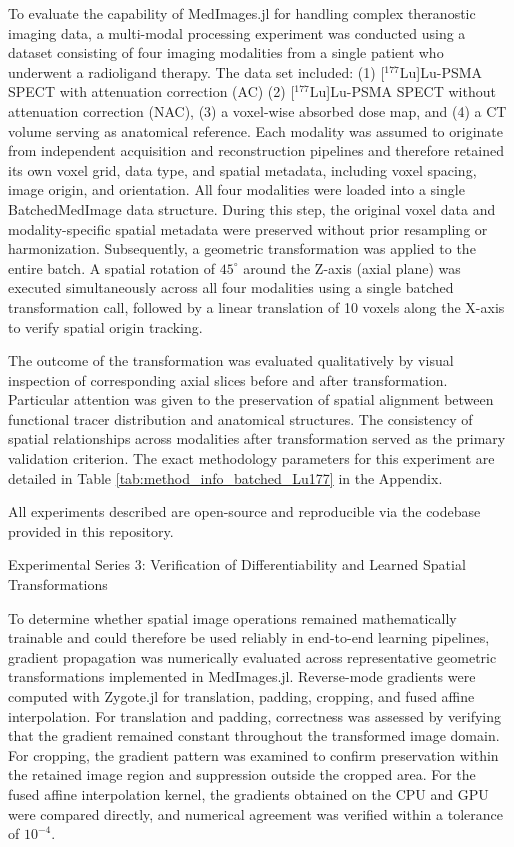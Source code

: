 \documentclass[a4paper,10pt]{elsarticle}
\begin{document}
To evaluate the capability of MedImages.jl for handling complex theranostic imaging data, a multi-modal processing experiment was conducted using a dataset consisting of four imaging modalities from a single patient who underwent a radioligand therapy. The data set included: (1) [$^{177}$Lu]Lu-PSMA SPECT with attenuation correction (AC) (2) [$^{177}$Lu]Lu-PSMA SPECT without attenuation correction (NAC), (3) a voxel-wise absorbed dose map, and (4) a CT volume serving as anatomical reference. Each modality was assumed to originate from independent acquisition and reconstruction pipelines and therefore retained its own voxel grid, data type, and spatial metadata, including voxel spacing, image origin, and orientation. All four modalities were loaded into a single BatchedMedImage data structure. During this step, the original voxel data and modality-specific spatial metadata were preserved without prior resampling or harmonization. Subsequently, a geometric transformation was applied to the entire batch. A spatial rotation of $45^{\circ}$ around the Z-axis (axial plane) was executed simultaneously across all four modalities using a single batched transformation call, followed by a linear translation of 10 voxels along the X-axis to verify spatial origin tracking.


The outcome of the transformation was evaluated qualitatively by visual inspection of corresponding axial slices before and after transformation. Particular attention was given to the preservation of spatial alignment between functional tracer distribution and anatomical structures. The consistency of spatial relationships across modalities after transformation served as the primary validation criterion. The exact methodology parameters for this experiment are detailed in Table \ref{tab:method_info_batched_Lu177} in the Appendix. 

 All experiments described are open-source and reproducible via the codebase provided in this repository.

Experimental Series 3: Verification of Differentiability and Learned Spatial Transformations

To determine whether spatial image operations remained mathematically trainable and could therefore be used reliably in end-to-end learning pipelines, gradient propagation was numerically evaluated across representative geometric transformations implemented in MedImages.jl. Reverse-mode gradients were computed with Zygote.jl for translation, padding, cropping, and fused affine interpolation. For translation and padding, correctness was assessed by verifying that the gradient remained constant throughout the transformed image domain. For cropping, the gradient pattern was examined to confirm preservation within the retained image region and suppression outside the cropped area. For the fused affine interpolation kernel, the gradients obtained on the CPU and GPU were compared directly, and numerical agreement was verified within a tolerance of $10^{-4}$. 
\end{document}
